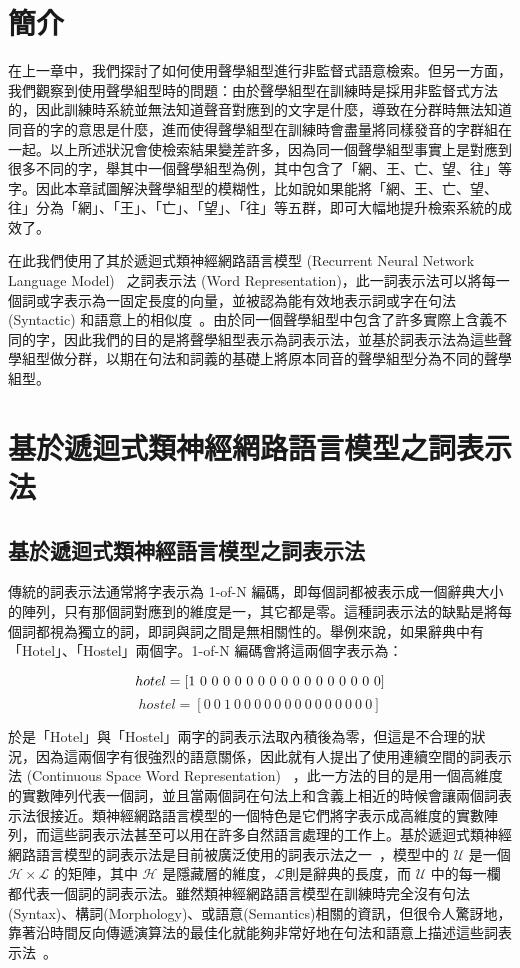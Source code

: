 \label{sec:chap5}
\section{簡介}
在上一章中，我們探討了如何使用聲學組型進行非監督式語意檢索。但另一方面，我們觀察到使用聲學組型時的問題：由於聲學組型在訓練時是採用非監督式方法的，因此訓練時系統並無法知道聲音對應到的文字是什麼，導致在分群時無法知道同音的字的意思是什麼，進而使得聲學組型在訓練時會盡量將同樣發音的字群組在一起。以上所述狀況會使檢索結果變差許多，因為同一個聲學組型事實上是對應到很多不同的字，舉其中一個聲學組型為例，其中包含了「網、王、亡、望、往」等字。因此本章試圖解決聲學組型的模糊性，比如說如果能將「網、王、亡、望、往」分為「網」、「王」、「亡」、「望」、「往」等五群，即可大幅地提升檢索系統的成效了。

在此我們使用了其於遞迴式類神經網路語言模型 (Recurrent Neural Network Language Model)~\cite{mikolov2010recurrent, mikolov2011extensions, mikolov2012context} 之詞表示法 (Word Representation)，此一詞表示法可以將每一個詞或字表示為一固定長度的向量，並被認為能有效地表示詞或字在句法 (Syntactic)
和語意上的相似度~\cite{mikolov2013linguistic}。由於同一個聲學組型中包含了許多實際上含義不同的字，因此我們的目的是將聲學組型表示為詞表示法，並基於詞表示法為這些聲學組型做分群，以期在句法和詞義的基礎上將原本同音的聲學組型分為不同的聲學組型。


\section{基於遞迴式類神經網路語言模型之詞表示法}

\subsection{基於遞迴式類神經語言模型之詞表示法}
傳統的詞表示法通常將字表示為 1-of-N 編碼，即每個詞都被表示成一個辭典大小的陣列，只有那個詞對應到的維度是一，其它都是零。這種詞表示法的缺點是將每個詞都視為獨立的詞，即詞與詞之間是無相關性的。舉例來說，如果辭典中有「Hotel」、「Hostel」兩個字。1-of-N 編碼會將這兩個字表示為：

\[
   hotel = [1\ 0\ 0\ 0\ 0\ 0\ 0\ 0\ 0\ 0\ 0\ 0\ 0\ 0\ 0\ 0\ 0] \\ 
\]
\[
   hostel = [0\ 0\ 1\ 0\ 0\ 0\ 0\ 0\ 0\ 0\ 0\ 0\ 0\ 0\ 0\ 0\ 0]
\]

於是「Hotel」與「Hostel」兩字的詞表示法取內積後為零，但這是不合理的狀況，因為這兩個字有很強烈的語意關係，因此就有人提出了使用連續空間的詞表示法 (Continuous Space Word Representation)~\cite{collobert2008unified, turian2010word}
，此一方法的目的是用一個高維度的實數陣列代表一個詞，並且當兩個詞在句法上和含義上相近的時候會讓兩個詞表示法很接近。類神經網路語言模型的一個特色是它們將字表示成高維度的實數陣列，而這些詞表示法甚至可以用在許多自然語言處理的工作上。基於遞迴式類神經網路語言模型的詞表示法是目前被廣泛使用的詞表示法之一~\cite{mikolov2010recurrent}，模型中的 $\mathcal{U}$ 是一個 $\mathcal{H} \times \mathcal{L}$ 的矩陣，其中 $\mathcal{H}$ 是隱藏層的維度，$\mathcal{L}$則是辭典的長度，而 $\mathcal{U}$
中的每一欄都代表一個詞的詞表示法。雖然類神經網路語言模型在訓練時完全沒有句法(Syntax)、構詞(Morphology)、或語意(Semantics)相關的資訊，但很令人驚訝地，靠著沿時間反向傳遞演算法的最佳化就能夠非常好地在句法和語意上描述這些詞表示法~\cite{mikolov2013linguistic}。

